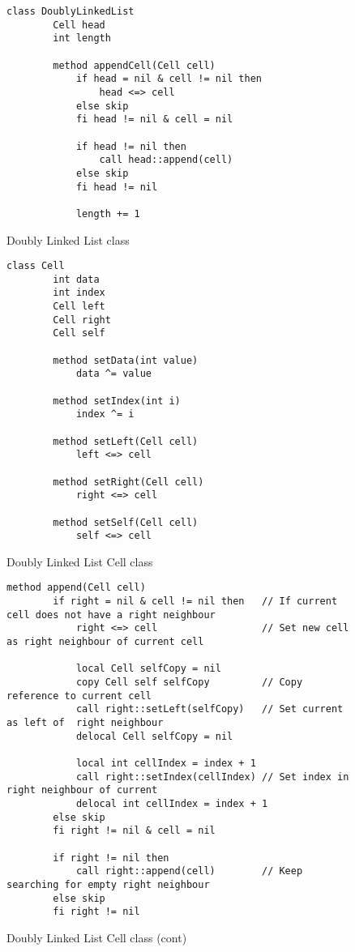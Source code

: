 \begin{figure}[ht!]
    \centering
    \begin{lstlisting}[style = basic, language = roopl] 
    class DoublyLinkedList
        Cell head
        int length
    
        method appendCell(Cell cell)
            if head = nil & cell != nil then
                head <=> cell
            else skip
            fi head != nil & cell = nil
    
            if head != nil then 
                call head::append(cell)
            else skip
            fi head != nil
    
            length += 1
    \end{lstlisting}
    \caption{Doubly Linked List class}
    \label{fig:doubly-linked-list-class}
\end{figure}

\begin{figure}[ht!]
    \centering
    \begin{lstlisting}[style = basic, language = roopl] 
        class Cell
        int data
        int index
        Cell left
        Cell right
        Cell self
    
        method setData(int value)
            data ^= value
    
        method setIndex(int i)
            index ^= i    
    
        method setLeft(Cell cell)
            left <=> cell
    
        method setRight(Cell cell)
            right <=> cell
    
        method setSelf(Cell cell)
            self <=> cell
    \end{lstlisting}
    \caption{Doubly Linked List Cell class}
    \label{fig:doubly-linked-list-cell-class}
\end{figure}

\begin{figure}[ht!]
    \centering
    \begin{lstlisting}[style = basic, language = roopl]
    method append(Cell cell)
        if right = nil & cell != nil then   // If current cell does not have a right neighbour
            right <=> cell                  // Set new cell as right neighbour of current cell
        
            local Cell selfCopy = nil      
            copy Cell self selfCopy         // Copy reference to current cell
            call right::setLeft(selfCopy)   // Set current as left of  right neighbour
            delocal Cell selfCopy = nil

            local int cellIndex = index + 1
            call right::setIndex(cellIndex) // Set index in right neighbour of current
            delocal int cellIndex = index + 1
        else skip
        fi right != nil & cell = nil

        if right != nil then
            call right::append(cell)        // Keep searching for empty right neighbour
        else skip
        fi right != nil 
    \end{lstlisting}
    \caption{Doubly Linked List Cell class (cont)}
    \label{fig:doubly-linked-list-cell-class-cont}
\end{figure}


